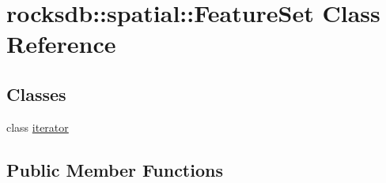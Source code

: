 \hypertarget{classrocksdb_1_1spatial_1_1FeatureSet}{}\section{rocksdb\+:\+:spatial\+:\+:Feature\+Set Class Reference}
\label{classrocksdb_1_1spatial_1_1FeatureSet}
\subsection*{Classes}
\begin{DoxyCompactItemize}
\item 
class \hyperlink{classrocksdb_1_1spatial_1_1FeatureSet_1_1iterator}{iterator}
\end{DoxyCompactItemize}
\subsection*{Public Member Functions}
